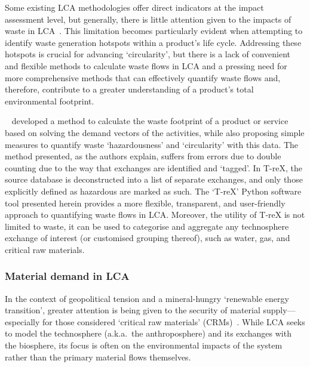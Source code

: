 \documentclass[a4paper,fleqn]{cas-dc}
\begin{document}
	Some existing LCA methodologies offer direct indicators at the impact
	assessment level, but generally, there is little attention given to the impacts
	of waste in LCA~\citep{lauran2020abioticdepletion}. This limitation becomes
	particularly evident when attempting to identify waste generation hotspots
	within a product's life cycle. Addressing these hotspots is crucial for
	advancing `circularity', but there is a lack of convenient and flexible methods
	to calculate waste flows in LCA and a pressing need for more comprehensive
	methods that can effectively quantify waste flows and, therefore, contribute to
	a greater understanding of a product's total environmental footprint.
	
	~\cite{laurenti2023wastefootprint} developed a method to calculate the waste footprint of a product or service based on solving the demand vectors of the activities, while also proposing simple measures to quantify waste `hazardousness' and `circularity' with this data. The method presented, as the authors explain, suffers from errors due to double counting due to the way that exchanges are identified and `tagged'. In T-reX, the source database is deconstructed into a list of separate exchanges, and only those explicitly defined as hazardous are marked as such. The `T-reX' Python software tool presented herein provides a more flexible, transparent, and user-friendly approach to quantifying waste flows in LCA\@. Moreover, the utility of T-reX is not limited to waste, it can be used to categorise and aggregate any technosphere exchange of interest (or customised grouping thereof), such as water, gas, and critical raw materials.
	
	\subsubsection{Material demand in LCA}\label{sec:intro-material}
	
	In the context of geopolitical tension and a mineral-hungry `renewable energy
	transition', greater attention is being given to the security of material
	supply---especially for those considered `critical raw materials'
	(CRMs)~\citep{eu2023crmstudy,hool2023crm,mancini2013supplysecurity,jrc2023supplychain,hartley2024cepolitics,salviulo2021supplychain,iea2023crm,iea2023energytechperspectives}.
	While LCA seeks to model the technosphere (a.k.a.\ the anthroposphere) and its
	exchanges with the biosphere, its focus is often on the environmental impacts
	of the system rather than the primary material flows themselves.
	
\end{document}
